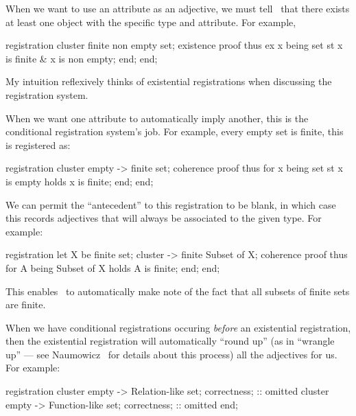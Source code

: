 \begin{node}\label{mizar-001V}%
When we want to use an attribute as an adjective, we must tell
\Mizar\ that there exists at least one object with the specific type and
attribute. For example,
\begin{mizar}
registration
  cluster finite non empty set;
  existence
  proof
    thus ex x being set st x is finite & x is non empty;
  end;
end;
\end{mizar}
My intuition reflexively thinks of existential registrations when
discussing the registration system.
\end{node}

\begin{node}\label{mizar-001W}%
When we want one attribute to automatically imply another, this is the
conditional registration system's job. For example, every empty set is
finite, this is registered as:
\begin{mizar}
registration
  cluster empty -> finite set;
  coherence
  proof
    thus for x being set st x is empty holds x is finite;
  end;
end;
\end{mizar}

\begin{node}\label{mizar-001X}%
We can permit the ``antecedent'' to this registration to be blank, in
which case this records adjectives that will always be associated to the
given type. For example:
\begin{mizar}
registration
  let X be finite set;
  cluster -> finite Subset of X;
  coherence
  proof
    thus for A being Subset of X holds A is finite;
  end;
end;
\end{mizar}
This enables \Mizar\ to automatically make note of the fact that all
subsets of finite sets are finite.
\end{node}

\begin{node}\label{mizar-001Y}%
When we have conditional registrations occuring \emph{before} an
existential registration, then the existential registration will
automatically ``round up'' (as in ``wrangle up'' --- see
Naumowicz~\cite{naumowicz2009enhanced} for details about this process)
all the adjectives for us. For example:
\begin{mizar}
registration
  cluster empty -> Relation-like set;
  correctness; :: omitted
  cluster empty -> Function-like set;
  correctness; :: omitted
end;


\end{mizar}
\end{node}
\end{node}
